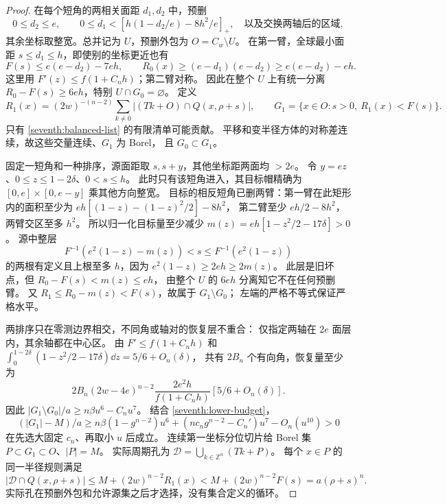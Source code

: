 \begin{proof}
在每个短角的两相关面距 \(d_1,d_2\) 中，预删
\begin{equation}\label{seventh:predeleted}
 0\le d_2\le e,\qquad
 0\le d_1<[h(1-d_2/e)-8h^2/e]_+,
 \quad\text{以及交换两轴后的区域},
\end{equation}
其余坐标取整宽。总并记为 \(U\)，预删外包为 \(O=C_w\setminus U\)。
在第一臂，全球最小面距 \(s\le d_1\le h\)，即使别的坐标更近也有
\[
 F(s)\le e(e-d_2)-7eh,\qquad
 R_0(x)\ge(e-d_1)(e-d_2)\ge e(e-d_2)-eh.
\]
这里用 \(F'(z)\le f(1+C_nh)\)；第二臂对称。
因此在整个 \(U\) 上有统一分离 \(R_0-F(s)\ge6eh\)，特别 \(U\cap G_0=\varnothing\)。
定义
\[
 R_1(x)=(2w)^{-(n-2)}\sum_{k\ne0}|(Tk+O)\cap Q(x,\rho+s)|,\qquad
 G_1=\{x\in O:s>0,\ R_1(x)<F(s)\}.
\]
只有 \eqref{seventh:balanced-list} 的有限清单可能贡献。
平移和变半径方体的对称差连续，故这些交量连续、\(G_1\) 为 Borel，
且 \(G_0\subset G_1\)。

固定一短角和一种排序，源面距取 \(s,s+y\)，其他坐标距两面均 \(>2e\)。
令 \(y=ez\)、\(0\le z\le1-2\delta\)、\(0<s\le h\)。
此时只有该短角进入，其目标帽精确为
\([0,e]\times[0,e-y]\) 乘其他方向整宽。
目标的相反短角已删两臂：第一臂在此矩形内的面积至少为
\(eh[(1-z)-(1-z)^2/2]-8h^2\)，
第二臂至少 \(eh/2-8h^2\)，两臂交区至多 \(h^2\)。
所以归一化目标量至少减少
\(m(z)=eh[1-z^2/2-17\delta]>0\)。
源中整层
\begin{equation}\label{seventh:restored}
 F^{-1}(e^2(1-z)-m(z))<s\le F^{-1}(e^2(1-z))
\end{equation}
的两根有定义且上根至多 \(h\)，因为
\(e^2(1-z)\ge2eh\ge2m(z)\)。
此层是旧坏点，但 \(R_0-F(s)<m(z)\le eh\)，
由整个 \(U\) 的 \(6eh\) 分离知它不在任何预删臂。
又 \(R_1\le R_0-m(z)<F(s)\)，故属于 \(G_1\setminus G_0\)；
左端的严格不等式保证严格水平。

两排序只在零测边界相交，不同角或轴对的恢复层不重合：
仅指定两轴在 \(2e\) 面层内，其余轴都在中心区。
由 \(F'\le f(1+C_nh)\) 和
\(\int_0^{1-2\delta}(1-z^2/2-17\delta)\dd z=5/6+O_n(\delta)\)，
共有 \(2B_n\) 个有向角，恢复量至少为
\[
 2B_n(2w-4e)^{n-2}
 \frac{2e^2h}{f(1+C_nh)}[5/6+O_n(\delta)].
\]
因此 \(|G_1\setminus G_0|/a\ge n\beta u^6-C_nu^7\)。
结合 \eqref{seventh:lower-budget}，
\[
 (|G_1|-M)/a\ge
 n\beta(1-g^{n-2})u^6+
 (nc_ng^{n-2}-C_n')u^7-O_n(u^{10})>0
\]
在先选大固定 \(c_n\)、再取小 \(u\) 后成立。
连续第一坐标分位切片给 Borel 集 \(P\subset G_1\subset O\)、\(|P|=M\)。
实际周期孔为 \(\mathscr D=\bigcup_{k\in\mathbb Z^n}(Tk+P)\)。
每个 \(x\in P\) 的同一半径规则满足
\[
 |\mathscr D\cap Q(x,\rho+s)|\le M+(2w)^{n-2}R_1(x)
 <M+(2w)^{n-2}F(s)=a(\rho+s)^n.
\]
实际孔在预删外包和允许源集之后才选择，没有集合定义的循环。


\end{proof}
